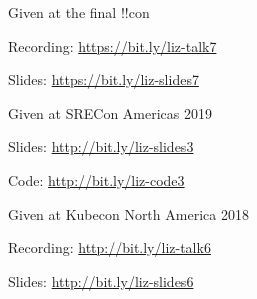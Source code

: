 \documentclass[letterpaper,11pt,notitlepage]{article}
\begin{document}
      \begin{employment}
          \item Given at the final !!con
          \item Recording: \url{https://bit.ly/liz-talk7}
          \item Slides: \url{https://bit.ly/liz-slides7}
      \end{employment}
      \begin{employment}
          \item Given at SRECon Americas 2019
          \item Slides: \url{http://bit.ly/liz-slides3}
          \item Code: \url{http://bit.ly/liz-code3}
      \end{employment}
      \begin{employment}
        \item Given at Kubecon North America 2018
        \item Recording: \url{http://bit.ly/liz-talk6}
        \item Slides: \url{http://bit.ly/liz-slides6}
      \end{employment}
\end{document}

